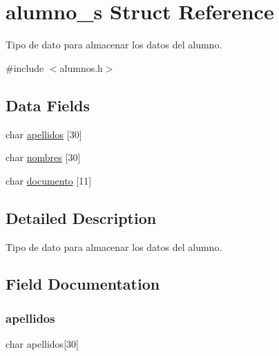 \hypertarget{structalumno__s}{}\section{alumno\+\_\+s Struct Reference}
\label{structalumno__s}


Tipo de dato para almacenar los datos del alumno.  




{\ttfamily \#include $<$alumnos.\+h$>$}

\subsection*{Data Fields}
\begin{DoxyCompactItemize}
\item 
char \hyperlink{structalumno__s_a5e029a212d8e40bd9a9faee1bf7abfb6}{apellidos} \mbox{[}30\mbox{]}
\item 
char \hyperlink{structalumno__s_a1f4dfcb0f32082d74e1686c35f6dde7d}{nombres} \mbox{[}30\mbox{]}
\item 
char \hyperlink{structalumno__s_a266528572a4545fe91bdc4ef9406c38d}{documento} \mbox{[}11\mbox{]}
\end{DoxyCompactItemize}


\subsection{Detailed Description}
Tipo de dato para almacenar los datos del alumno. 

\subsection{Field Documentation}
\mbox{\label{structalumno__s_a5e029a212d8e40bd9a9faee1bf7abfb6}} 
\subsubsection{\texorpdfstring{apellidos}{apellidos}}
{\footnotesize\ttfamily char apellidos\mbox{[}30\mbox{]}}

\mbox{\label{structalumno__s_a266528572a4545fe91bdc4ef9406c38d}} 

